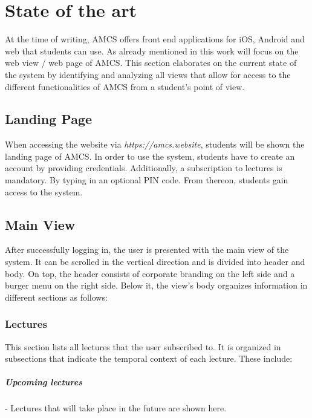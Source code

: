 \chapter{State of the art}
\label{chapter:stateoftheart}
At the time of writing, AMCS offers front end applications for iOS, Android and web that students can use. As already mentioned in \todosct this work will focus on the web view / web page of AMCS.
This section elaborates on the current state of the system by identifying and analyzing all views that allow for access to the different functionalities of AMCS from a student's point of view. 


\section{Landing Page}
\label{section:landingpage}
When accessing the website via \emph{https://amcs.website}, students will be shown the landing page of AMCS.
In order to use the system, students have to create an account by providing credentials. Additionally, a subscription to lectures is mandatory. By typing in an optional PIN code. From thereon, students gain access to the system. 
\todogrf
 
\section{Main View}
After successfully logging in, the user is presented with the main view of the system.
It can be scrolled in the vertical direction and is divided into header and body. On top, the header consists of corporate branding on the left side and a burger menu on the right side. Below it, the view's body organizes information in different sections as follows:

\todogrf

\subsection{Lectures}

This section lists all lectures that the user subscribed to. It is organized in subsections that indicate the temporal context of each lecture. These include:

\paragraph{Upcoming lectures} - Lectures that will take place in the future are shown here.
